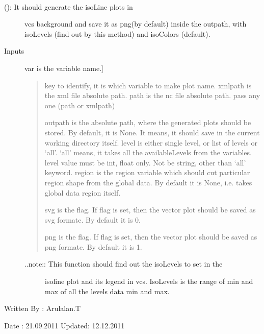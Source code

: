 \documentclass[letterpaper,10pt,english]{sphinxmanual}
\begin{document}

\begin{fulllineitems}
\label{diagnosis:generate_iso_plots.genIsoLinePlots}~\begin{description}
\item[{{\hyperref[diagnosis:generate_iso_plots.genIsoLinePlots]{}} (): It should generate the isoLine plots in}] \leavevmode
vcs background and save it as png(by default) inside the outpath,
with isoLevels (find out by this method) and isoColors (default).

\item[{Inputs}] \leavevmode{[}var is the variable name.{]}\begin{quote}

key to identify, it is which variable to make plot name.
xmlpath is the xml file absolute path.
path is the nc file absolute path.
pass any one (path or xmlpath)

outpath is the absolute path, where the generated plots should be
stored. By default, it is None. It means, it should save in the
current working directory itself.
level is either single level, or list of levels or `all'.
`all' means, it takes all the availableLevels from the variables.
level value must be int, float only. Not be string, other than
`all' keyword.
region is the region variable which should cut particular region
shape from the global data. By default it is None, i.e. takes
global data region itself.

svg is the flag. If flag is set, then the vector plot should be
saved as svg formate. By default it is 0.

png is the flag. If flag is set, then the vector plot should be
saved as png formate. By default it is 1.
\end{quote}
\begin{description}
\item[{..note:: This function should find out the isoLevels to set in the}] \leavevmode
isoline plot and its legend in vcs. IsoLevels is the range of min and
max of all the levels data min and max.

\end{description}

\end{description}

Written By : Arulalan.T

Date : 21.09.2011
Updated: 12.12.2011

\end{fulllineitems}
\end{document}
